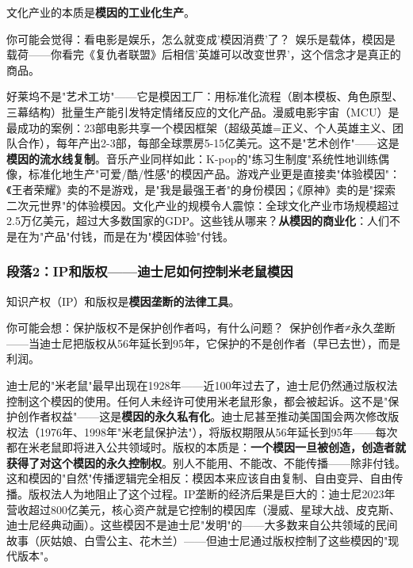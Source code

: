 \documentclass[../main.tex]{subfiles}
\begin{document}
	文化产业的本质是\textbf{模因的工业化生产}。

	\begin{tcolorbox}[colback=yellow!5, title=\textit{读者行为预测}]

		你可能会觉得：看电影是娱乐，怎么就变成'模因消费'了？\ 娱乐是载体，模因是载荷——你看完《复仇者联盟》后相信'英雄可以改变世界'，这个信念才是真正的商品。

	\end{tcolorbox}

好莱坞不是"艺术工坊"——它是模因工厂：用标准化流程（剧本模板、角色原型、三幕结构）批量生产能引发特定情绪反应的文化产品。漫威电影宇宙（MCU）是最成功的案例：23部电影共享一个模因框架（超级英雄=正义、个人英雄主义、团队合作），每年产出2-3部，每部全球票房5-15亿美元。这不是"艺术创作"——这是\textbf{模因的流水线复制}。音乐产业同样如此：K-pop的"练习生制度"系统性地训练偶像，标准化地生产"可爱/酷/性感"的模因产品。游戏产业更是直接卖"体验模因"：《王者荣耀》卖的不是游戏，是"我是最强王者"的身份模因；《原神》卖的是"探索二次元世界"的体验模因。文化产业的规模令人震惊：全球文化产业市场规模超过2.5万亿美元，超过大多数国家的GDP。这些钱从哪来？\textbf{从模因的商业化}：人们不是在为"产品"付钱，而是在为"模因体验"付钱。

	\subsubsection*{段落2：IP和版权——迪士尼如何控制米老鼠模因}

	知识产权（IP）和版权是\textbf{模因垄断的法律工具}。

	\begin{tcolorbox}[colback=yellow!5, title=\textit{读者行为预测}]

		你可能会想：保护版权不是保护创作者吗，有什么问题？\ 保护创作者≠永久垄断——当迪士尼把版权从56年延长到95年，它保护的不是创作者（早已去世），而是利润。

	\end{tcolorbox}

迪士尼的"米老鼠"最早出现在1928年——近100年过去了，迪士尼仍然通过版权法控制这个模因的使用。任何人未经许可使用米老鼠形象，都会被起诉。这不是"保护创作者权益"——这是\textbf{模因的永久私有化}。迪士尼甚至推动美国国会两次修改版权法（1976年、1998年"米老鼠保护法"），将版权期限从56年延长到95年——每次都在米老鼠即将进入公共领域时。版权的本质是：\textbf{一个模因一旦被创造，创造者就获得了对这个模因的永久控制权}。别人不能用、不能改、不能传播——除非付钱。这和模因的"自然"传播逻辑完全相反：模因本来应该自由复制、自由变异、自由传播。版权法人为地阻止了这个过程。IP垄断的经济后果是巨大的：迪士尼2023年营收超过800亿美元，核心资产就是它控制的模因库（漫威、星球大战、皮克斯、迪士尼经典动画）。这些模因不是迪士尼"发明"的——大多数来自公共领域的民间故事（灰姑娘、白雪公主、花木兰）——但迪士尼通过版权控制了这些模因的"现代版本"。
\end{document}
